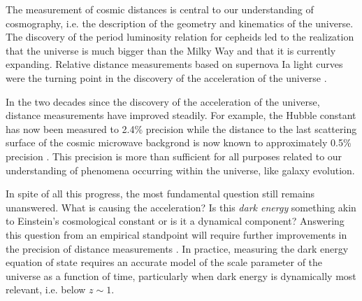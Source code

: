 The measurement of cosmic distances is central to our understanding of
cosmography, i.e. the description of the geometry and kinematics of
the universe. The discovery of the period luminosity relation for
cepheids led to the realization that the universe is much bigger than
the Milky Way and that it is currently expanding. Relative distance
measurements based on supernova Ia light curves were the turning point
in the discovery of the acceleration of the universe
\citep{Riess:1998p21184,Per++99}.

In the two decades since the discovery of the acceleration of the
universe, distance measurements have improved steadily. For example,
the Hubble constant has now been measured to 2.4\% precision
\citep{Rie++16} while the distance to the last scattering surface of
the cosmic microwave backgrond is now known to approximately 0.5\%
precision \cite[depending on the assumed cosmological
model]{WMAP9,Planck15}. This precision is more than sufficient for all
purposes related to our understanding of phenomena occurring within
the universe, like galaxy evolution.

In spite of all this progress, the most fundamental question still
remains unanswered. What is causing the acceleration? Is this {\it
dark energy} something akin to Einstein's cosmological constant or is
it a dynamical component? Answering this question from an empirical
standpoint will require further improvements in the precision of
distance measurements \citep{Suy++12,Wei++13,Rie++16}.  In practice,
measuring the dark energy equation of state requires an accurate model
of the scale parameter of the universe as a function of time,
particularly when dark energy is dynamically most relevant, i.e. below
$z\sim1$. 


